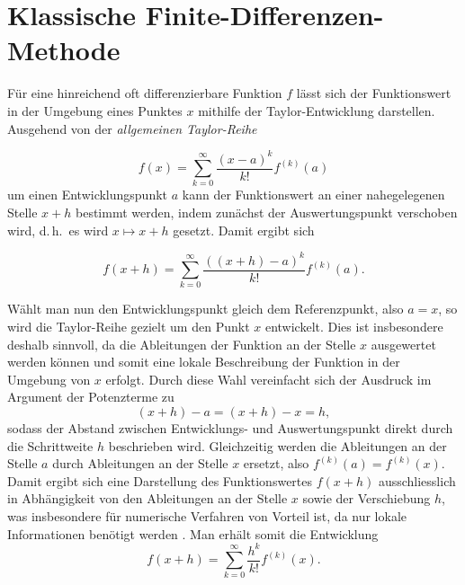 %
%
%
%


\section{Klassische Finite-Differenzen-Methode}


Für eine hinreichend oft differenzierbare Funktion $f$ lässt sich der Funktionswert 
in der Umgebung eines Punktes $x$ mithilfe der Taylor-Entwicklung darstellen. 
%
Ausgehend von der \emph{allgemeinen Taylor-Reihe}

\begin{equation}
	f(x) = \sum_{k=0}^{\infty} \frac{(x-a)^k}{k!} f^{(k)}(a)
	\label{step:taylor1}
\end{equation}
um einen Entwicklungspunkt $a$ kann der Funktionswert an einer nahegelegenen Stelle $x+h$ bestimmt werden, indem 
zunächst der Auswertungspunkt verschoben wird, d.\,h.\ es wird $x \mapsto x+h$ gesetzt. 
Damit ergibt sich

\begin{equation*}
	f(x+h) = \sum_{k=0}^{\infty} \frac{((x+h)-a)^k}{k!} f^{(k)}(a).
\end{equation*}

Wählt man nun den Entwicklungspunkt gleich dem Referenzpunkt, also $a = x$, so wird 
die Taylor-Reihe gezielt um den Punkt $x$ entwickelt. Dies ist insbesondere deshalb 
sinnvoll, da die Ableitungen der Funktion an der Stelle $x$ ausgewertet werden können und 
somit eine lokale Beschreibung der Funktion in der Umgebung von $x$ erfolgt.
Durch diese Wahl vereinfacht sich der Ausdruck im Argument der Potenzterme zu
\[
(x+h) - a = (x+h) - x = h,
\]
sodass der Abstand zwischen Entwicklungs- und Auswertungspunkt direkt durch die 
Schrittweite $h$ beschrieben wird. Gleichzeitig werden die Ableitungen an der Stelle 
$a$ durch Ableitungen an der Stelle $x$ ersetzt, also $f^{(k)}(a) = f^{(k)}(x)$.
Damit ergibt sich eine Darstellung des Funktionswertes $f(x+h)$ ausschliesslich in 
Abhängigkeit von den Ableitungen an der Stelle $x$ sowie der Verschiebung $h$, was 
insbesondere für numerische Verfahren von Vorteil ist, da nur lokale Informationen 
benötigt werden \cite{step:higham2002}.
Man erhält somit die Entwicklung
\begin{equation}
	f(x+h) = \sum_{k=0}^{\infty} \frac{h^k}{k!} f^{(k)}(x).
			\label{step:taylor2}
\end{equation}

